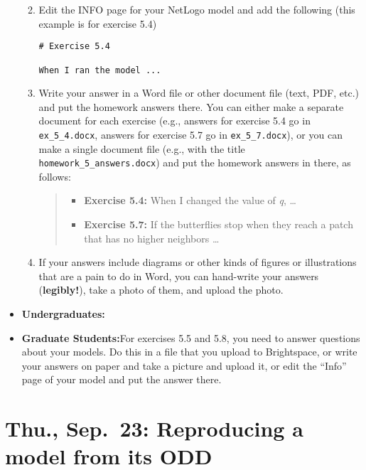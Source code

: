 \documentclass[
]{article}
\providecommand{\tightlist}{%
  \setlength{\itemsep}{0pt}\setlength{\parskip}{0pt}}
\begin{document}
\begin{itemize}
  \begin{enumerate}
  \def\labelenumi{\arabic{enumi}.}
  \item
    Edit the INFO page for your NetLogo model and add the following
    (this example is for exercise 5.4)

\begin{verbatim}
# Exercise 5.4

When I ran the model ...
\end{verbatim}
  \item
    Write your answer in a Word file or other document file (text, PDF,
    etc.) and put the homework answers there. You can either make a
    separate document for each exercise (e.g., answers for exercise 5.4
    go in \texttt{ex\_5\_4.docx}, answers for exercise 5.7 go in
    \texttt{ex\_5\_7.docx}), or you can make a single document file
    (e.g., with the title \texttt{homework\_5\_answers.docx}) and put
    the homework answers in there, as follows:

    \begin{quote}
    \begin{itemize}
    \tightlist
    \item
      \textbf{Exercise 5.4:} When I changed the value of \emph{q},
      \ldots{}
    \item
      \textbf{Exercise 5.7:} If the butterflies stop when they reach a
      patch that has no higher neighbors \ldots{}
    \end{itemize}
    \end{quote}
  \item
    If your answers include diagrams or other kinds of figures or
    illustrations that are a pain to do in Word, you can hand-write your
    answers (\textbf{legibly!}), take a photo of them, and upload the
    photo.
  \end{enumerate}
\item
  \textbf{Undergraduates:}
\item
  \textbf{Graduate Students:}For exercises 5.5 and 5.8, you need to
  answer questions about your models. Do this in a file that you upload
  to Brightspace, or write your answers on paper and take a picture and
  upload it, or edit the ``Info'' page of your model and put the answer
  there.
\end{itemize}

\hypertarget{thu.-sep.-23-reproducing-a-model-from-its-odd}{%
\section{Thu., Sep.~23: Reproducing a model from its
ODD}\label{thu.-sep.-23-reproducing-a-model-from-its-odd}}
\end{document}
